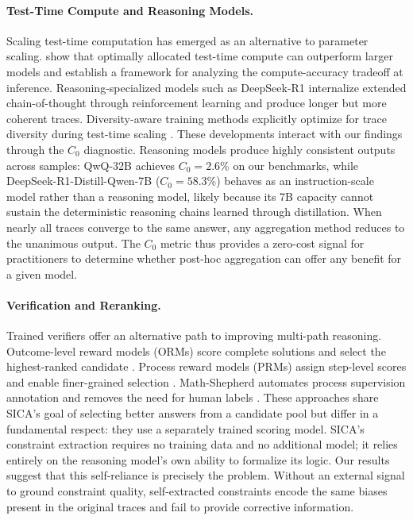 \paragraph{Test-Time Compute and Reasoning Models.}
Scaling test-time computation has emerged as an alternative to parameter scaling. \citet{snell2025scaling} show that optimally allocated test-time compute can outperform larger models and establish a framework for analyzing the compute-accuracy tradeoff at inference. Reasoning-specialized models such as DeepSeek-R1 \citep{deepseek2025r1} internalize extended chain-of-thought through reinforcement learning and produce longer but more coherent traces. Diversity-aware training methods explicitly optimize for trace diversity during test-time scaling \citep{diverseaware2025}. These developments interact with our findings through the $C_0$ diagnostic. Reasoning models produce highly consistent outputs across samples: QwQ-32B achieves $C_0 = 2.6\%$ on our benchmarks, while DeepSeek-R1-Distill-Qwen-7B ($C_0 = 58.3\%$) behaves as an instruction-scale model rather than a reasoning model, likely because its 7B capacity cannot sustain the deterministic reasoning chains learned through distillation. When nearly all traces converge to the same answer, any aggregation method reduces to the unanimous output. The $C_0$ metric thus provides a zero-cost signal for practitioners to determine whether post-hoc aggregation can offer any benefit for a given model.

\paragraph{Verification and Reranking.}
Trained verifiers offer an alternative path to improving multi-path reasoning. Outcome-level reward models (ORMs) score complete solutions and select the highest-ranked candidate \citep{cobbe2021gsm8k}. Process reward models (PRMs) assign step-level scores and enable finer-grained selection \citep{lightman2023prm}. Math-Shepherd automates process supervision annotation and removes the need for human labels \citep{wang2024mathshepherd}. These approaches share SICA's goal of selecting better answers from a candidate pool but differ in a fundamental respect: they use a separately trained scoring model. SICA's constraint extraction requires no training data and no additional model; it relies entirely on the reasoning model's own ability to formalize its logic. Our results suggest that this self-reliance is precisely the problem. Without an external signal to ground constraint quality, self-extracted constraints encode the same biases present in the original traces and fail to provide corrective information.

